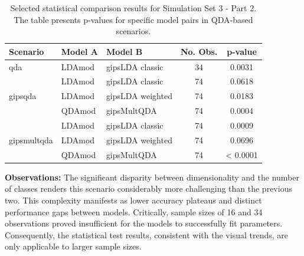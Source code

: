 \documentclass[a4paper,11pt,twoside]{report}
\theoremstyle{definition}
\begin{document}
\begin{table}[H]
    \centering
    \setlength{\tabcolsep}{4pt}
    \small
    \begin{tabular}{lllc c}
    \toprule
    \textbf{Scenario} & \textbf{Model A} & \textbf{Model B} & \textbf{No. Obs.} & \textbf{p-value} \\
    \midrule
    \multirow{1}{*}{qda}
      & LDAmod & gipsLDA classic & 34 & 0.0031 \\
    \midrule
    \multirow{3}{*}{gipsqda}
      & \multirow{1}{*}{LDAmod} & \multirow{1}{*}{gipsLDA classic} & 74 & 0.0618 \\
      \cmidrule{2-5}
      & \multirow{1}{*}{LDAmod} & \multirow{1}{*}{gipsLDA weighted} & 74 & 0.0183 \\
      \cmidrule{2-5}
      & \multirow{1}{*}{QDAmod} & \multirow{1}{*}{gipsMultQDA} & 74 & 0.0004 \\
    \midrule
    \multirow{3}{*}{gipsmultqda}
      & \multirow{1}{*}{LDAmod} & \multirow{1}{*}{gipsLDA classic} & 74 & 0.0009\\
      \cmidrule{2-5}
      & \multirow{1}{*}{LDAmod} & \multirow{1}{*}{gipsLDA weighted} & 74 & 0.0696 \\
      \cmidrule{2-5}
      & \multirow{1}{*}{QDAmod} & \multirow{1}{*}{gipsMultQDA} & 74 & < 0.0001 \\
    \bottomrule
    \end{tabular}
    \caption{Selected statistical comparison results for Simulation Set 3 - Part 2. The table presents p-values for specific model pairs in QDA-based scenarios.}
    \label{tab:stat_sim_3_part1}
\end{table}

\textbf{Observations:}
The significant disparity between dimensionality and the number of classes renders this scenario considerably more challenging than the previous two.
This complexity manifests as lower accuracy plateaus and distinct performance gaps between models. Critically, sample sizes of 16 and 34 observations proved insufficient for the models to successfully fit parameters.
Consequently, the statistical test results, consistent with the visual trends, are only applicable to larger sample sizes.
\end{document}
